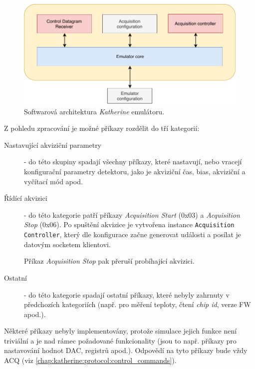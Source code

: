 \begin{figure}[h]
	\begin{center}
		\includegraphics[width=14cm]{figures/katherine_emulator_arch.pdf}
		\caption{Softwarová architektura \textit{Katherine} emulátoru.}
		\label{fig:katherine:emulator:arch}
	\end{center}
\end{figure}

Z pohledu zpracování je možné příkazy rozdělit do tří kategorií:
\begin{description}
    \item[Nastavující akviziční parametry] - do této skupiny spadají všechny příkazy, které nastavují, nebo vracejí konfigurační parametry detektoru, jako je akviziční čas, bias, akviziční a vyčítací mód apod.
    \item[Řídící akvizici] - do této kategorie patří příkazy \textit{Acquisition Start} (0x03) a \textit{Acquisition Stop} (0x06). Po spuštění akvizice je vytvořena instance \texttt{Acquisition Controller}, který dle konfigurace začne generovat události a posílat je datovým socketem klientovi.
    
    Příkaz \textit{Acquisition Stop} pak přeruší probíhající akvizici.
    \item[Ostatní] - do této kategorie spadají ostatní příkazy, které nebyly zahrnuty v předchozích kategoriích (např. pro měření teploty, čtení \textit{chip id}, verze FW apod.).
\end{description}

Některé příkazy nebyly implementovány, protože simulace jejich funkce není triviální a je nad rámec požadované funkcionality (jsou to např. příkazy pro nastavování hodnot DAC, registrů apod.). Odpovědí na tyto příkazy bude vždy ACQ (viz \ref{chap:katherine:protocol:control_commands}).

